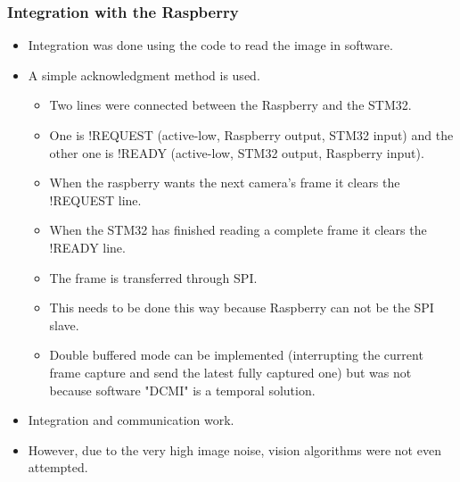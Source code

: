 
\subsubsection{Integration with the Raspberry}
\begin{itemize}
	\item Integration was done using the code to read the image in software.
	\item A simple acknowledgment method is used.
	\begin{itemize}
		\item Two lines were connected between the Raspberry and the STM32.
		\item One is !REQUEST (active-low, Raspberry output, STM32 input) and the other one is !READY (active-low, STM32 output, Raspberry input).
		\item When the raspberry wants the next camera's frame it clears the !REQUEST line.
		\item When the STM32 has finished reading a complete frame it clears the !READY line.
		\item The frame is transferred through SPI.
		\item This needs to be done this way because Raspberry can not be the SPI slave.
		\item Double buffered mode can be implemented (interrupting the current frame capture and send the latest fully captured one) but was not because software "DCMI" is a temporal solution.
	\end{itemize}
	\item Integration and communication work.
	\item However, due to the very high image noise, vision algorithms were not even attempted.
\end{itemize}


